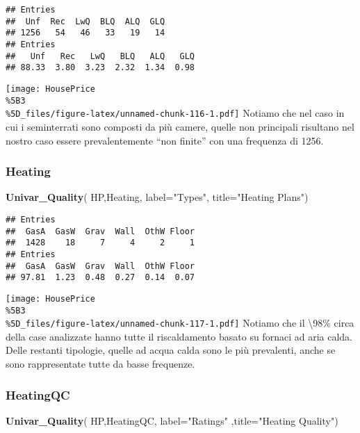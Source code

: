 \documentclass[
]{article}
\newenvironment{Shaded}{\begin{snugshade}}{\end{snugshade}}
\newcommand{\AttributeTok}[1]{\textcolor[rgb]{0.13,0.29,0.53}{#1}}
\newcommand{\FunctionTok}[1]{\textcolor[rgb]{0.13,0.29,0.53}{\textbf{#1}}}
\newcommand{\NormalTok}[1]{#1}
\newcommand{\StringTok}[1]{\textcolor[rgb]{0.31,0.60,0.02}{#1}}
\begin{document}
\begin{verbatim}
## Entries
##  Unf  Rec  LwQ  BLQ  ALQ  GLQ 
## 1256   54   46   33   19   14 
## Entries
##   Unf   Rec   LwQ   BLQ   ALQ   GLQ 
## 88.33  3.80  3.23  2.32  1.34  0.98
\end{verbatim}

\texttt{[image: HousePrice\\\%5B3\\\%5D\_files/figure-latex/unnamed-chunk-116-1.pdf]}
Notiamo che nel caso in cui i seminterrati sono composti da più camere,
quelle non principali risultano nel nostro caso essere prevalentemente
``non finite'' con una frequenza di 1256.

\subsubsection{Heating}\label{heating}

\begin{Shaded}
\begin{Highlighting}[]
\FunctionTok{Univar\_Quality}\NormalTok{(}
\NormalTok{  HP,Heating,}
  \AttributeTok{label=}\StringTok{"Types"}\NormalTok{,}
  \AttributeTok{title=}\StringTok{"Heating Plans"}\NormalTok{)}
\end{Highlighting}
\end{Shaded}

\begin{verbatim}
## Entries
##  GasA  GasW  Grav  Wall  OthW Floor 
##  1428    18     7     4     2     1 
## Entries
##  GasA  GasW  Grav  Wall  OthW Floor 
## 97.81  1.23  0.48  0.27  0.14  0.07
\end{verbatim}

\texttt{[image: HousePrice\\\%5B3\\\%5D\_files/figure-latex/unnamed-chunk-117-1.pdf]}
Notiamo che il \textbackslash98\% circa della case analizzate hanno
tutte il riscaldamento basato su fornaci ad aria calda. Delle restanti
tipologie, quelle ad acqua calda sono le più prevalenti, anche se sono
rappresentate tutte da basse frequenze.

\subsubsection{HeatingQC}\label{heatingqc}

\begin{Shaded}
\begin{Highlighting}[]
\FunctionTok{Univar\_Quality}\NormalTok{(}
\NormalTok{  HP,HeatingQC,}
  \AttributeTok{label=}\StringTok{"Ratings"}
\NormalTok{  ,}\AttributeTok{title=}\StringTok{"Heating Quality"}\NormalTok{)}
\end{Highlighting}
\end{Shaded}
\end{document}
